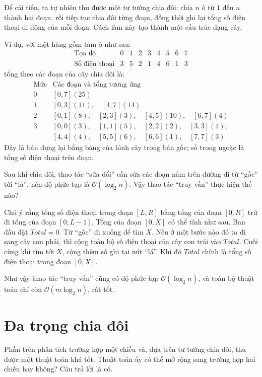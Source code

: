 \documentclass[11pt]{article}
\newcommand{\Oh}{\mathcal{O}}
\begin{document}
Để cải tiến, ta tự nhiên thu được một tư tưởng chia đôi: chia \(n\) ô từ
\(1\) đến \(n\) thành hai đoạn, rồi tiếp tục chia đôi từng đoạn, đồng thời ghi
lại tổng số điện thoại di động của mỗi đoạn. Cách làm này tạo thành một cấu
trúc dạng cây.

Ví dụ, với một hàng gồm tám ô như sau:
\[
\begin{array}{c|cccccccc}
\text{Tọa độ} & 0&1&2&3&4&5&6&7\\
\hline
\text{Số điện thoại} & 3&5&2&1&4&6&1&3
\end{array}
\]
tổng theo các đoạn của cây chia đôi là:
\[
\begin{array}{c|l}
\text{Mức} & \text{Các đoạn và tổng tương ứng}\\
\hline
0 & [0,7](25)\\
1 & [0,3](11),\quad [4,7](14)\\
2 & [0,1](8),\quad [2,3](3),\quad [4,5](10),\quad [6,7](4)\\
3 & [0,0](3),\quad [1,1](5),\quad [2,2](2),\quad [3,3](1),\\
  & [4,4](4),\quad [5,5](6),\quad [6,6](1),\quad [7,7](3)
\end{array}
\]
Đây là bản dựng lại bằng bảng của hình cây trong bản gốc; số trong ngoặc là
tổng số điện thoại trên đoạn.

Sau khi chia đôi, thao tác ``sửa đổi'' cần sửa các đoạn nằm trên đường đi từ
``gốc'' tới ``lá'', nên độ phức tạp là \(\Oh(\log_2 n)\). Vậy thao tác
``truy vấn'' thực hiện thế nào?

Chú ý rằng tổng số điện thoại trong đoạn \([L,R]\) bằng tổng của đoạn
\([0,R]\) trừ đi tổng của đoạn \([0,L-1]\). Tổng của đoạn \([0,X]\) có thể
tính như sau. Ban đầu đặt \(\mathit{Total}=0\). Từ ``gốc'' đi xuống để tìm
\(X\). Nếu ở một bước nào đó ta đi sang cây con phải, thì cộng toàn bộ số
điện thoại của cây con trái vào \(\mathit{Total}\). Cuối cùng khi tìm tới
\(X\), cộng thêm số ghi tại nút ``lá''. Khi đó \(\mathit{Total}\) chính là
tổng số điện thoại trong đoạn \([0,X]\).

Như vậy thao tác ``truy vấn'' cũng có độ phức tạp \(\Oh(\log_2 n)\), và toàn
bộ thuật toán chỉ còn \(\Oh(m\log_2 n)\), rất tốt.

\section{Đa trọng chia đôi}

Phần trên phân tích trường hợp một chiều và, dựa trên tư tưởng chia đôi, thu
được một thuật toán khá tốt. Thuật toán ấy có thể mở rộng sang trường hợp hai
chiều hay không? Câu trả lời là có.
\end{document}
